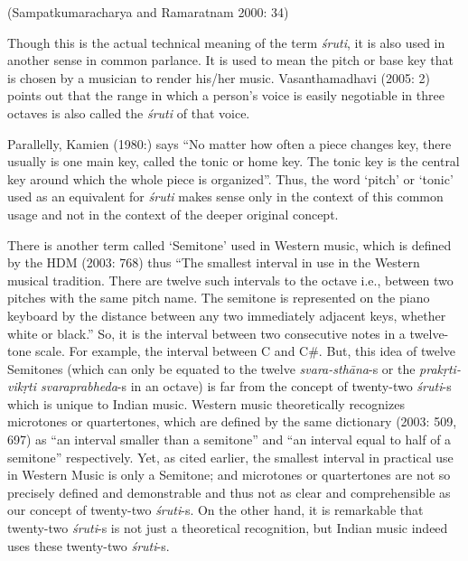 \begin{flushright}
(Sampatkumaracharya and Ramaratnam 2000: 34)
\end{flushright}

Though this is the actual technical meaning of the term \textit{śruti}, it is also used in another sense in common parlance. It is used to mean the pitch or base key that is chosen by a musician to render his/her music. Vasanthamadhavi (2005: 2) points out that the range in which a person’s voice is easily negotiable in three octaves is also called the \textit{śruti} of that voice. 

Parallelly, Kamien (1980:) says “No matter how often a piece changes key, there usually is one main key, called the tonic or home key. The tonic key is the central key around which the whole piece is organized”. Thus, the word ‘pitch’ or ‘tonic’ used as an equivalent for \textit{śruti} makes sense only in the context of this common usage and not in the context of the deeper original concept.

There is another term called ‘Semitone’ used in Western music, which is defined by the HDM (2003: 768) thus “The smallest interval in use in the Western musical tradition. There are twelve such intervals to the octave i.e., between two pitches with the same pitch name. The semitone is represented on the piano keyboard by the distance between any two immediately adjacent keys, whether white or black.” So, it is the interval between two consecutive notes in a twelve-tone scale. For example, the interval between C and C\#. But, this idea of twelve Semitones (which can only be equated to the twelve \textit{svara-sthāna}-s or the \textit{prakṛti-vikṛti svaraprabheda}-s in an octave) is far from the concept of twenty-two \textit{śruti}-s which is unique to Indian music. Western music theoretically recognizes microtones or quartertones, which are defined by the same dictionary (2003: 509, 697) as “an interval smaller than a semitone” and “an interval equal to half of a semitone” respectively. Yet, as cited earlier, the smallest interval in practical use in Western Music is only a Semitone; and microtones or quartertones are not so precisely defined and demonstrable and thus not as clear and comprehensible as our concept of twenty-two \textit{śruti}-s. On the other hand, it is remarkable that twenty-two \textit{śruti}-s is not just a theoretical recognition, but Indian music indeed uses these twenty-two \textit{śruti}-s.


